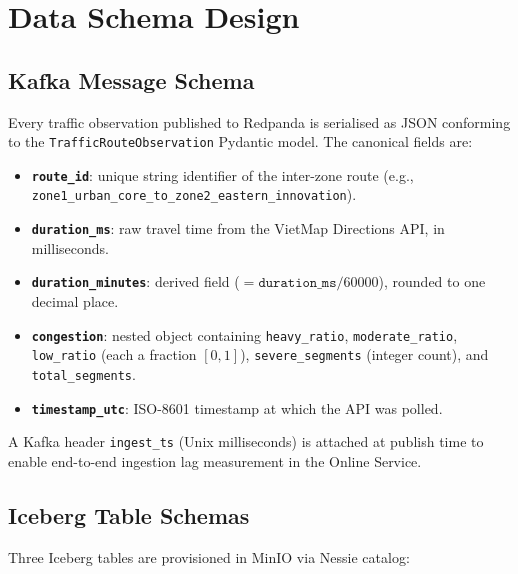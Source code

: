\section{Data Schema Design}
\label{sec:schema-design}

\subsection{Kafka Message Schema}

Every traffic observation published to Redpanda is serialised as JSON conforming
to the \texttt{TrafficRouteObservation} Pydantic model. The canonical fields are:

\begin{itemize}
  \item \textbf{\texttt{route\_id}}: unique string identifier of the inter-zone
        route (e.g., \texttt{zone1\_urban\_core\_\allowbreak to\_zone2\_eastern\_innovation}).
  \item \textbf{\texttt{duration\_ms}}: raw travel time from the VietMap Directions
        API, in milliseconds.
  \item \textbf{\texttt{duration\_minutes}}: derived field ($= \texttt{duration\_ms}
        / 60000$), rounded to one decimal place.
  \item \textbf{\texttt{congestion}}: nested object containing
        \texttt{heavy\_ratio}, \texttt{moderate\_ratio},
        \texttt{low\_ratio} (each a fraction $[0,1]$),
        \texttt{severe\_segments} (integer count), and
        \texttt{total\_segments}.
  \item \textbf{\texttt{timestamp\_utc}}: ISO-8601 timestamp at which the API
        was polled.
\end{itemize}

\noindent A Kafka header \texttt{ingest\_ts} (Unix milliseconds) is attached at
publish time to enable end-to-end ingestion lag measurement in the Online Service.

\subsection{Iceberg Table Schemas}

Three Iceberg tables are provisioned in MinIO via Nessie catalog:

